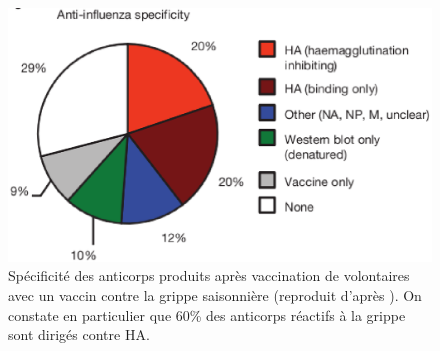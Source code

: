 \begin{figure}[!htbp]
  \begin{center}
    \includegraphics[width=0.7\linewidth]{graphs/intro/ac.eps}
  \end{center}
  \caption{Spécificité des anticorps produits après vaccination de
    volontaires avec un vaccin contre la grippe saisonnière (reproduit
    d'après \citet{Wrammert2008}). On constate en particulier que 60\%
    des anticorps réactifs à la grippe sont dirigés contre HA.}
  \label{fig:1:ac}
\end{figure}

